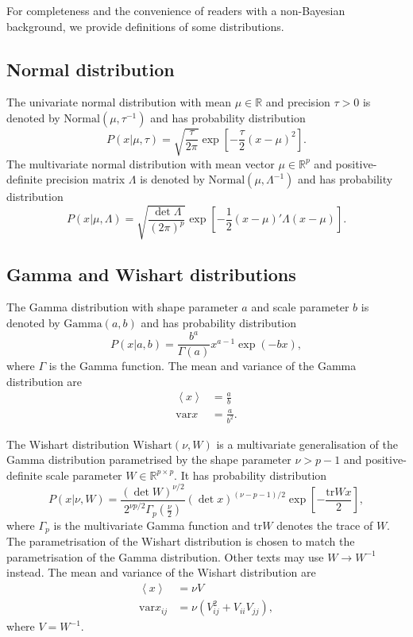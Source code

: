 \documentclass[onecolumn,pre,superscriptaddress, longbibliography, nofootinbib, notitlepage]{revtex4-1}
\newcommand{\E}[1]{\left\langle#1 \right\rangle}
\newcommand{\normal}{\mathrm{Normal}}
\newcommand{\dgamma}{\mathrm{Gamma}}
\newcommand{\wishart}{\mathrm{Wishart}}
\newcommand{\var}{\mathrm{var}}
\newcommand{\trace}{\mathrm{tr}}
\begin{document}
 For completeness and the convenience of readers with a non-Bayesian background, we provide definitions of some distributions.

\subsection{Normal distribution}

The univariate normal distribution with mean $\mu\in\mathbb{R}$ and precision $\tau > 0$ is denoted by $\normal(\mu, \tau^{-1})$ and has probability distribution
\[
    P(x|\mu, \tau) = \sqrt{\frac{\tau}{2\pi}} \exp\left[-\frac{\tau}{2}{(x - \mu)}^2\right].
\]
The multivariate normal distribution with mean vector $\mu\in\mathbb{R}^p$ and positive-definite precision matrix $\Lambda$ is denoted by $\normal(\mu, \Lambda^{-1})$ and has probability distribution
\[
    P(x|\mu, \Lambda) = \sqrt{\frac{\det \Lambda}{{(2\pi)}^p}} \exp\left[-\frac{1}{2}(x-\mu)'\Lambda(x-\mu)\right].
\]

\subsection{Gamma and Wishart distributions}

The Gamma distribution with shape parameter $a$ and scale parameter $b$ is denoted by $\dgamma(a, b)$ and has probability distribution
\[
    P(x|a, b) = \frac{b^a}{\Gamma(a)} x^{a-1} \exp(-b x),
\]
where $\Gamma$ is the Gamma function. The mean and variance of the Gamma distribution are
\begin{align}
    \E{x}&= \frac{a}{b}\\
    \var{x}&= \frac{a}{b^2}.
\end{align}

The Wishart distribution $\wishart(\nu, W)$ is a multivariate generalisation of the Gamma distribution parametrised by the shape parameter $\nu > p-1$ and positive-definite scale parameter $W\in\mathbb{R}^{p\times p}$. It has probability distribution
\[
    P(x|\nu, W) = \frac{{(\det W)}^{\nu/2}}{2^{\nu p / 2}\Gamma_p\left(\frac{\nu}{2}\right)}{(\det x)}^{(\nu - p - 1) / 2} \exp\left[-\frac{\trace{Wx}}{2}\right],
\]
where $\Gamma_p$ is the multivariate Gamma function and $\trace W$ denotes the trace of $W$. The parametrisation of the Wishart distribution is chosen to match the parametrisation of the Gamma distribution. Other texts may use $W\rightarrow W^{-1}$ instead. The mean and variance of the Wishart distribution are
\begin{align}
    \E{x}&= \nu V\\
    \var{x_{ij}}&= \nu \left(V_{ij}^2 + V_{ii}V_{jj}\right),
\end{align}
where $V = W^{-1}$.
\end{document}
